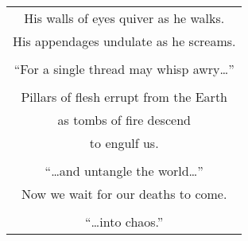 \documentclass{article}
\begin{document}
\begin{center}
\begin{tabular}{c}
His walls of eyes quiver as he walks. \\
His appendages undulate as he screams. \\
\\
``For a single thread may whisp awry\ldots{}'' \\
\\
Pillars of flesh errupt from the Earth \\
as tombs of fire descend \\
to engulf us. \\
\\
``\ldots{}and untangle the world\ldots{}''
\\
Now we wait for our deaths to come. \\
\\
``\ldots{}into chaos.''
\end{tabular}
\end{center}
\end{document}

